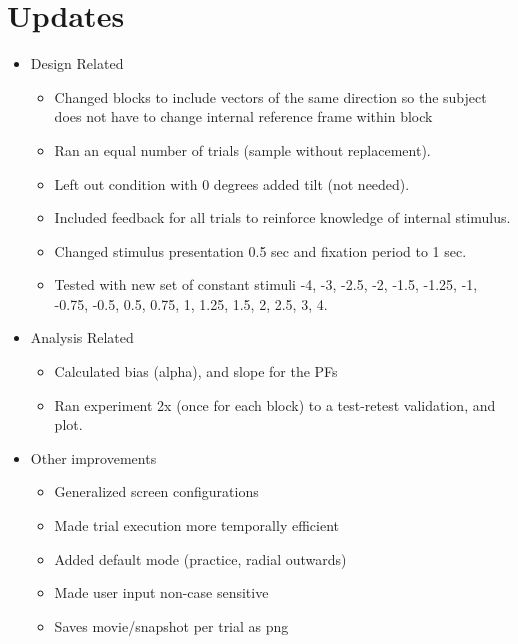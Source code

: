 \documentclass[11pt]{article} %
\begin{document}
\section{Updates} 
\begin{itemize}
\item Design Related
	\begin{itemize}
	\item Changed blocks to include vectors of the same direction so the subject does not have to change internal reference frame within block
	\item Ran an equal number of trials (sample without replacement).
	\item Left out condition with 0 degrees added tilt (not needed).
	\item Included feedback for all trials to reinforce knowledge of internal stimulus.
	\item Changed stimulus presentation 0.5 sec and fixation period to 1 sec.
	\item Tested with new set of constant stimuli {-4, -3, -2.5, -2, -1.5, -1.25, -1, -0.75, -0.5, 0.5, 0.75, 1, 1.25, 1.5, 2, 2.5, 3, 4}.
	\end{itemize}
\item Analysis Related
	\begin{itemize}
	\item Calculated bias (alpha), and slope for the PFs
	\item Ran experiment 2x (once for each block) to a test-retest validation, and plot.
	\end{itemize}
\item Other improvements
	\begin{itemize}
	\item Generalized screen configurations
	\item Made trial execution more temporally efficient
	\item Added default mode (practice, radial outwards)
	\item Made user input non-case sensitive
	\item Saves movie/snapshot per trial as png
	\end{itemize}
\end{itemize}
\end{document}
